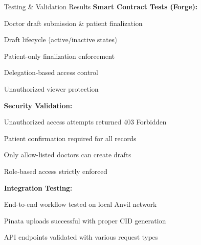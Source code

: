 \documentclass[10pt]{beamer}
\let\olditemize\itemize
\let\endolditemize\enditemize
\renewenvironment{itemize}
  {\olditemize\justifying}
  {\endolditemize}
\begin{document}
\begin{frame}{Testing \& Validation Results}
\textbf{Smart Contract Tests (Forge):}
\begin{itemize}
\item \textcolor{green!60!black}{\checkmark} Doctor draft submission \& patient finalization
\item \textcolor{green!60!black}{\checkmark} Draft lifecycle (active/inactive states)
\item \textcolor{green!60!black}{\checkmark} Patient-only finalization enforcement
\item \textcolor{green!60!black}{\checkmark} Delegation-based access control
\item \textcolor{green!60!black}{\checkmark} Unauthorized viewer protection
\end{itemize}

\vspace{0.3cm}
\textbf{Security Validation:}
\begin{itemize}
\item Unauthorized access attempts returned 403 Forbidden
\item Patient confirmation required for all records
\item Only allow-listed doctors can create drafts
\item Role-based access strictly enforced
\end{itemize}

\vspace{0.3cm}
\textbf{Integration Testing:}
\begin{itemize}
\item End-to-end workflow tested on local Anvil network
\item Pinata uploads successful with proper CID generation
\item API endpoints validated with various request types
\end{itemize}
\end{frame}
\end{document}
